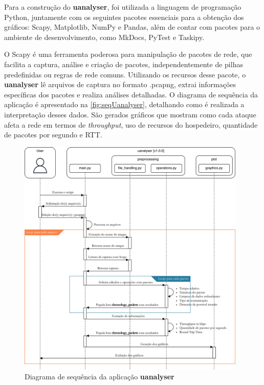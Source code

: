         Para a construção do \textbf{uanalyser}, foi utilizada a linguagem de programação Python, juntamente com os seguintes pacotes essenciais para a obtenção dos gráficos: Scapy, Matplotlib, NumPy e Pandas, além de contar com pacotes para o ambiente de desenvolvimento, como MkDocs, PyTest e Taskipy.

        O Scapy é uma ferramenta poderosa para manipulação de pacotes de rede, que facilita a captura, análise e criação de pacotes, independentemente de pilhas predefinidas ou regras de rede comuns. Utilizando os recursos desse pacote, o \textbf{uanalyser} lê arquivos de captura no formato .pcapng, extrai informações específicas dos pacotes e realiza análises detalhadas. O diagrama de sequência da aplicação é apresentado na \autoref{fig:seqUanalyser}, detalhando como é realizada a interpretação desses dados. São gerados gráficos que mostram como cada ataque afeta a rede em termos de \textit{throughput}, uso de recursos do hospedeiro, quantidade de pacotes por segundo e RTT.

        \begin{figure}[htbp!]
            \caption{\label{fig:seqUanalyser}Diagrama de sequência da aplicação \textbf{uanalyser}}
            \begin{center}
                \includegraphics[width=0.972\textwidth]{USPSC-img/seqUanalyser.png}
            \end{center}
        \end{figure}


